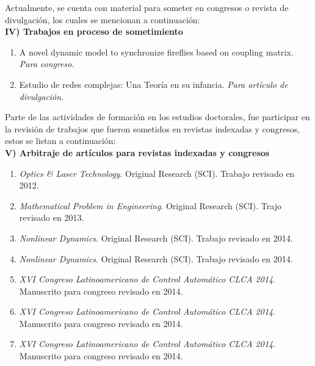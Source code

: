 Actualmente, se cuenta con material para someter en congresos o revista de divulgación, los cuales se mencionan a continuación: \\

\textbf{IV) Trabajos en proceso de sometimiento}
\begin{enumerate}
\item A novel dynamic model to synchronize fireflies based on coupling matrix. \textit{Para congreso}.
\item Estudio de redes complejas: Una Teoría en su infancia. \textit{Para artículo de divulgación}. \\
\end{enumerate}

Parte de las actividades de formación en los estudios doctorales, fue participar en la revisión de trabajos que fueron sometidos en revistas indexadas y congresos, estos se listan a continuación: \\

\textbf{V) Arbitraje de artículos para revistas indexadas y congresos}
\begin{enumerate}
\item \textit{Optics \& Laser Technology}. Original Research (SCI). Trabajo revisado en 2012.

\item \textit{Mathematical Problem in Engineering}. Original Research (SCI). Trajo revisado en 2013.

\item \textit{Nonlinear Dynamics}. Original Research (SCI). Trabajo revisado en 2014. 

\item \textit{Nonlinear Dynamics}. Original Research (SCI). Trabajo revisado en 2014.

\item \textit{XVI Congreso Latinoamericano de Control Automático CLCA 2014}. Manuscrito para congreso revisado en 2014.

\item \textit{XVI Congreso Latinoamericano de Control Automático CLCA 2014}. Manuscrito para congreso revisado en 2014.

\item \textit{XVI Congreso Latinoamericano de Control Automático CLCA 2014}. Manuscrito para congreso revisado en 2014.  \\

\end{enumerate}